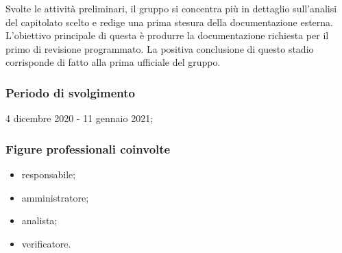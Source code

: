 Svolte le attività preliminari, il gruppo si concentra più in dettaglio sull'analisi del capitolato scelto e redige una prima stesura della documentazione esterna. L'obiettivo principale di questa  è produrre la documentazione richiesta per il primo  di revisione programmato. La positiva conclusione di questo stadio corrisponde di fatto alla prima  ufficiale del gruppo.
        
        \subsubsection{Periodo di svolgimento}
        4 dicembre 2020 - 11 gennaio 2021;
        
        \subsubsection{Figure professionali coinvolte}
            \begin{itemize}
                \item responsabile;
                \item amministratore;
                \item analista;
                \item verificatore.
            \end{itemize}
        
